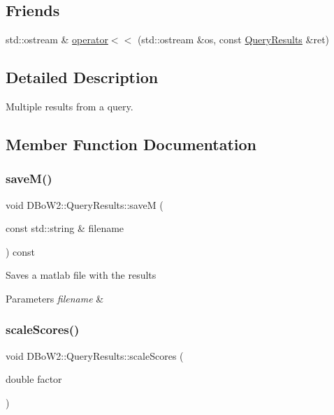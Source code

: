 \subsection*{Friends}
\begin{DoxyCompactItemize}
\item 
std\+::ostream \& \hyperlink{classDBoW2_1_1QueryResults_aa03bed8e3c1357b52ce23ec7b9d3a149}{operator$<$$<$} (std\+::ostream \&os, const \hyperlink{classDBoW2_1_1QueryResults}{Query\+Results} \&ret)
\end{DoxyCompactItemize}


\subsection{Detailed Description}
Multiple results from a query. 

\subsection{Member Function Documentation}
\mbox{\label{classDBoW2_1_1QueryResults_adb484d12c8bf6d3428213fddcb65e699}} 
\subsubsection{\texorpdfstring{save\+M()}{saveM()}}
{\footnotesize\ttfamily void D\+Bo\+W2\+::\+Query\+Results\+::saveM (\begin{DoxyParamCaption}\item[{const std\+::string \&}]{filename }\end{DoxyParamCaption}) const}

Saves a matlab file with the results 
\begin{DoxyParams}{Parameters}
{\em filename} & \\
\hline
\end{DoxyParams}
\mbox{\label{classDBoW2_1_1QueryResults_aa47048267696191c070545c935e28b47}} 
\subsubsection{\texorpdfstring{scale\+Scores()}{scaleScores()}}
{\footnotesize\ttfamily void D\+Bo\+W2\+::\+Query\+Results\+::scale\+Scores (\begin{DoxyParamCaption}\item[{double}]{factor }\end{DoxyParamCaption})\hspace{0.3cm}{\ttfamily [inline]}}

